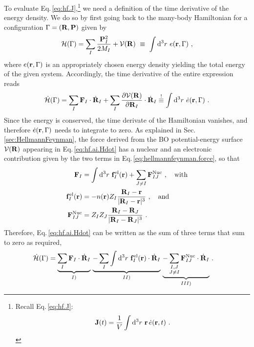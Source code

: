 To evaluate Eq.\,\eqref{eq:hf.J},\footnote{Recall Eq.\,\eqref{eq:hf.J}:$${\bf J} (t) 
	= \frac{1}{V} \int {\rm d}^3 r ~ {\bf r} \, \dot{e} ({\bf r}, t)~.$$} we need a definition of the time derivative of the energy density. We do so by first going back to the many-body Hamiltonian for a configuration $\Gamma = ({\bf R}, {\bf P})$ given by
\begin{align}
	\mathcal H (\Gamma) = \sum_I \frac{\b P_I^2}{2 M_I} + \mathcal V(\b R) 
		~\equiv~ \int \d^3 r ~ e (\b r, \Gamma)~,
  \label{eq:hf.ai.H}
\end{align}
where $e ({\bf r}, \Gamma)$ is an appropriately chosen energy density yielding the total energy of the given system. Accordingly, the time derivative of the entire expression reads
\begin{align}
	\dot{\mathcal H} (\Gamma)
		= \sum_I \b F_I \cdot \dot{\b R}_I 
		+ \sum_I \frac{\partial \mathcal V(\b R)}{\partial \b R_I} \cdot \dot{\b R}_I
			\label{eq:hf.ai.Hdot}
		\stackrel{!}{\equiv}
			\int \d^3 r ~ \dot{e} (\b r , \Gamma)~.
\end{align}
Since the energy is conserved, the time derivate of the Hamiltonian vanishes, and therefore $\dot{e} ({\bf r}, \Gamma)$ needs to integrate to zero.
As explained in Sec.\,\ref{sec:HellmannFeynman}, the force derived from the BO potential-energy surface $\mathcal V ({\bf R})$ appearing in Eq.\,\eqref{eq:hf.ai.Hdot} has a nuclear and an electronic contribution given by the two terms in Eq.\,\eqref{eq:hellmannfeynman.force}, so that
\begin{align}
	\b F_I
		&%
			= \int \d^3 r ~ \b f_I^{\rm el} (\b r) + \sum_{J \neq I} \b F_{IJ}^{\rm Nuc}~, \quad\text{with}
		\label{eq:hf.ai.F}\\
	\b f_I^{\rm el} (\b r)
		&= - n(\b r) Z_I \frac{\b R_I - \b r}{\lvert \b R_I - \b r \rvert^3}~,
		\label{eq:hf.ai.Fel}
		\quad\text{and} \\
	\b F_{IJ}^{\rm Nuc}
		&= Z_I Z_J \frac{\b R_I - \b R_J}{\lvert \b R_I - \b R_J \rvert^3}~.
		\label{eq:hf.ai.Fnuc}
\end{align}
Therefore, Eq.\,\eqref{eq:hf.ai.Hdot} can be written as the sum of three terms that sum to zero as required,
\begin{align}
	\dot{\mathcal H} (\Gamma)
		&= \underset{I)}{\underbrace{\sum_I {\bf F}_I \cdot \dot{{\bf R}}_I}} ~ 
			 \underset{II)}{\underbrace{-\sum_{I} \int {\rm d}^3 r ~ {\bf f}_I^{\rm el} ({\bf r}) \cdot \dot{{\bf R}}_I}} ~
			 \underset{III)}{\underbrace{-\sum_{\substack{I, J \\ J \neq I}} {\bf F}^{\rm Nuc}_{IJ} \cdot \dot{{\bf R}}_I}}~.
\end{align}
